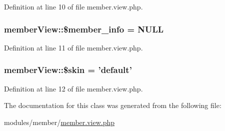 Definition at line 10 of file member.\-view.\-php.

\hypertarget{classmemberView_a435c30d8223b51ac6b6a568142dc6c2e}{
\subsubsection[{\$member\-\_\-info}]{\setlength{\rightskip}{0pt plus 5cm}member\-View\-::\$member\-\_\-info = N\-U\-L\-L}}\label{classmemberView_a435c30d8223b51ac6b6a568142dc6c2e}


Definition at line 11 of file member.\-view.\-php.

\hypertarget{classmemberView_a01171d2b82e91a06754a9f8c52af6962}{
\subsubsection[{\$skin}]{\setlength{\rightskip}{0pt plus 5cm}member\-View\-::\$skin = 'default'}}\label{classmemberView_a01171d2b82e91a06754a9f8c52af6962}


Definition at line 12 of file member.\-view.\-php.



The documentation for this class was generated from the following file\-:\begin{DoxyCompactItemize}
\item 
modules/member/\hyperlink{member_8view_8php}{member.\-view.\-php}\end{DoxyCompactItemize}

